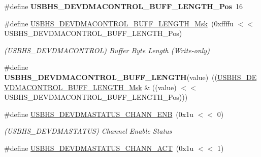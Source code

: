 \begin{DoxyCompactItemize}
\mbox{\label{group__SAMV71__USBHS_gaad173b16d3590fafce3d5e59024be02c}} 
\#define {\bfseries U\+S\+B\+H\+S\+\_\+\+D\+E\+V\+D\+M\+A\+C\+O\+N\+T\+R\+O\+L\+\_\+\+B\+U\+F\+F\+\_\+\+L\+E\+N\+G\+T\+H\+\_\+\+Pos}~16
\item 
\mbox{\label{group__SAMV71__USBHS_gab7cc3056aeb7d9b49c34b00988756993}} 
\#define \mbox{\hyperlink{group__SAMV71__USBHS_gab7cc3056aeb7d9b49c34b00988756993}{U\+S\+B\+H\+S\+\_\+\+D\+E\+V\+D\+M\+A\+C\+O\+N\+T\+R\+O\+L\+\_\+\+B\+U\+F\+F\+\_\+\+L\+E\+N\+G\+T\+H\+\_\+\+Msk}}~(0xffffu $<$$<$ U\+S\+B\+H\+S\+\_\+\+D\+E\+V\+D\+M\+A\+C\+O\+N\+T\+R\+O\+L\+\_\+\+B\+U\+F\+F\+\_\+\+L\+E\+N\+G\+T\+H\+\_\+\+Pos)
\begin{DoxyCompactList}\small\item\em (U\+S\+B\+H\+S\+\_\+\+D\+E\+V\+D\+M\+A\+C\+O\+N\+T\+R\+OL) Buffer Byte Length (Write-\/only) \end{DoxyCompactList}\item 
\mbox{\label{group__SAMV71__USBHS_gaeeee9e744d9b3b4e0d05fdee54fa1ba3}} 
\#define {\bfseries U\+S\+B\+H\+S\+\_\+\+D\+E\+V\+D\+M\+A\+C\+O\+N\+T\+R\+O\+L\+\_\+\+B\+U\+F\+F\+\_\+\+L\+E\+N\+G\+TH}(value)~((\mbox{\hyperlink{group__SAMV71__USBHS_gab7cc3056aeb7d9b49c34b00988756993}{U\+S\+B\+H\+S\+\_\+\+D\+E\+V\+D\+M\+A\+C\+O\+N\+T\+R\+O\+L\+\_\+\+B\+U\+F\+F\+\_\+\+L\+E\+N\+G\+T\+H\+\_\+\+Msk}} \& ((value) $<$$<$ U\+S\+B\+H\+S\+\_\+\+D\+E\+V\+D\+M\+A\+C\+O\+N\+T\+R\+O\+L\+\_\+\+B\+U\+F\+F\+\_\+\+L\+E\+N\+G\+T\+H\+\_\+\+Pos)))
\item 
\mbox{\label{group__SAMV71__USBHS_ga4102378a0925234238961d88caa949b1}} 
\#define \mbox{\hyperlink{group__SAMV71__USBHS_ga4102378a0925234238961d88caa949b1}{U\+S\+B\+H\+S\+\_\+\+D\+E\+V\+D\+M\+A\+S\+T\+A\+T\+U\+S\+\_\+\+C\+H\+A\+N\+N\+\_\+\+E\+NB}}~(0x1u $<$$<$ 0)
\begin{DoxyCompactList}\small\item\em (U\+S\+B\+H\+S\+\_\+\+D\+E\+V\+D\+M\+A\+S\+T\+A\+T\+US) Channel Enable Status \end{DoxyCompactList}\item 
\mbox{\label{group__SAMV71__USBHS_ga982a52b634020ac48449b7a15532abcc}} 
\#define \mbox{\hyperlink{group__SAMV71__USBHS_ga982a52b634020ac48449b7a15532abcc}{U\+S\+B\+H\+S\+\_\+\+D\+E\+V\+D\+M\+A\+S\+T\+A\+T\+U\+S\+\_\+\+C\+H\+A\+N\+N\+\_\+\+A\+CT}}~(0x1u $<$$<$ 1)

\end{DoxyCompactItemize}
